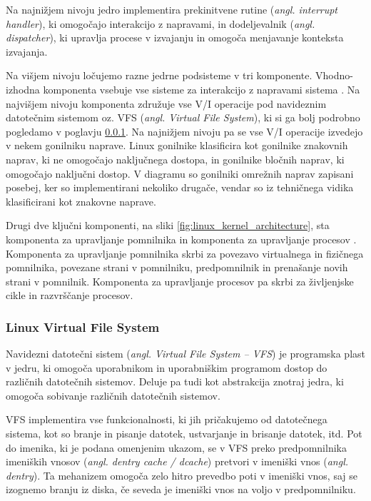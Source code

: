 \documentclass[a4paper,12pt,openright]{book}
\begin{document}
Na najnižjem nivoju jedro implementira prekinitvene rutine (\textit{angl. interrupt handler}), ki omogočajo interakcijo z napravami, 
in dodeljevalnik (\textit{angl. dispatcher}), ki upravlja procese v izvajanju in omogoča menjavanje konteksta izvajanja.

Na višjem nivoju ločujemo razne jedrne podsisteme v tri komponente.
Vhodno-izhodna komponenta vsebuje vse sisteme za interakcijo z napravami sistema \cite{Tanenbaum_Bos_2023}.
Na najvišjem nivoju komponenta združuje vse V/I operacije pod navideznim datotečnim sistemom oz. VFS (\textit{angl. Virtual File System}), ki si ga bolj podrobno pogledamo v poglavju \ref{ssec:linux:vfs}.
Na najnižjem nivoju pa se vse V/I operacije izvedejo v nekem gonilniku naprave.
Linux gonilnike klasificira kot gonilnike znakovnih naprav, ki ne omogočajo naključnega dostopa, in gonilnike bločnih naprav, ki omogočajo naključni dostop.
V diagramu so gonilniki omrežnih naprav zapisani posebej, ker so implementirani nekoliko drugače, vendar so iz tehničnega vidika klasificirani kot znakovne naprave.

Drugi dve ključni komponenti, na sliki \ref{fig:linux_kernel_architecture}, sta komponenta za upravljanje pomnilnika in komponenta za upravljanje procesov \cite{Tanenbaum_Bos_2023}.
Komponenta za upravljanje pomnilnika skrbi za povezavo virtualnega in fizičnega pomnilnika, povezane strani v pomnilniku, predpomnilnik in prenašanje novih strani v pomnilnik.
Komponenta za upravljanje procesov pa skrbi za življenjske cikle in razvrščanje procesov.

\subsubsection{Linux Virtual File System} \label{ssec:linux:vfs}

Navidezni datotečni sistem (\textit{angl. Virtual File System -- VFS}) je programska plast v jedru, ki omogoča uporabnikom in uporabniškim programom dostop do različnih datotečnih sistemov.
Deluje pa tudi kot abstrakcija znotraj jedra, ki omogoča sobivanje različnih datotečnih sistemov.

VFS \cite{Linux_kernel_docs_LVFS} implementira vse funkcionalnosti, ki jih pričakujemo od datotečnega sistema, kot so branje in pisanje datotek, ustvarjanje in brisanje datotek, itd.
Pot do imenika, ki je podana omenjenim ukazom, se v VFS preko predpomnilnika imeniških vnosov (\textit{angl. dentry cache / dcache}) pretvori v imeniški vnos (\textit{angl. dentry}).
Ta mehanizem omogoča zelo hitro prevedbo poti v imeniški vnos, saj se izognemo branju iz diska, če seveda je imeniški vnos na voljo v predpomnilniku.
\end{document}
